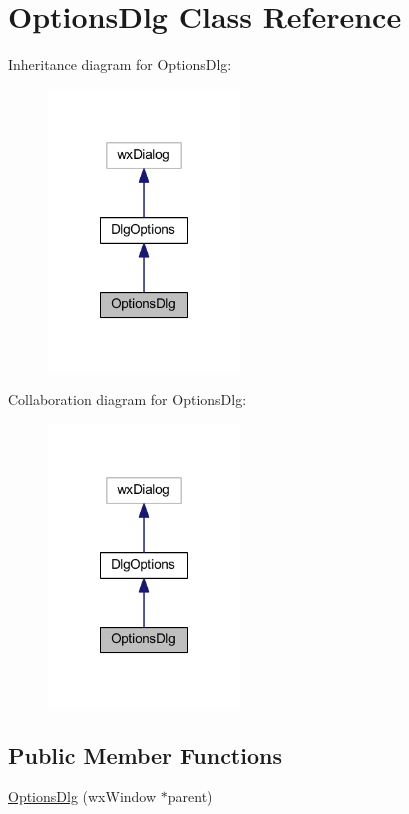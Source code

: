 \hypertarget{class_options_dlg}{\section{Options\-Dlg Class Reference}
\label{class_options_dlg}
}


Inheritance diagram for Options\-Dlg\-:
\nopagebreak
\begin{figure}[H]
\begin{center}
\leavevmode
\includegraphics[width=144pt]{class_options_dlg__inherit__graph}
\end{center}
\end{figure}


Collaboration diagram for Options\-Dlg\-:
\nopagebreak
\begin{figure}[H]
\begin{center}
\leavevmode
\includegraphics[width=144pt]{class_options_dlg__coll__graph}
\end{center}
\end{figure}
\subsection*{Public Member Functions}
\begin{DoxyCompactItemize}
\item 
\hyperlink{class_options_dlg_a40a392346d152d4b9e37e54bcf2cb40a}{Options\-Dlg} (wx\-Window $\ast$parent)
\end{DoxyCompactItemize}
